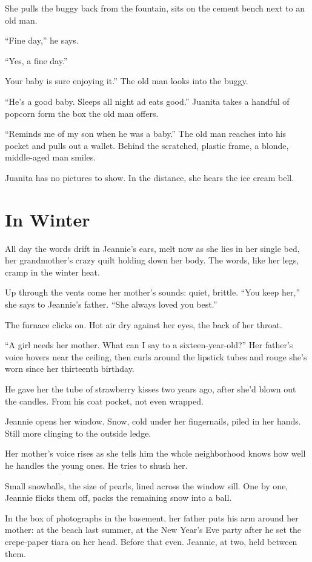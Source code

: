 \documentclass[twoside,10pt]{book}
\begin{document}
She pulls the buggy back from the fountain, sits on the cement bench
next to an old man.

``Fine day,'' he says.

``Yes, a fine day.''

Your baby is sure enjoying it.'' The old man looks into the buggy.

``He's a good baby. Sleeps all night ad eats good.'' Juanita takes a
handful of popcorn form the box the old man offers.

``Reminds me of my son when he was a baby.'' The old man reaches into
his pocket and pulls out a wallet. Behind the scratched, plastic frame,
a blonde, middle-aged man smiles.

Juanita has no pictures to show. In the distance, she hears the ice
cream bell.


\cleardoublepage
\chapter{In Winter}

All day the words drift in Jeannie's ears, melt now as she lies in her
single bed, her grand­mother's crazy quilt holding down her body. The
words, like her legs, cramp in the winter heat.

Up through the vents come her mother's sounds: quiet, brittle. ``You
keep her,'' she says to Jeannie's father. ``She always loved you best.''

The furnace clicks on. Hot air dry against her eyes, the back of her
throat.

``A girl needs her mother. What can I say to a sixteen-year-old?'' Her
father's voice hovers near the ceiling, then curls around the lipstick
tubes and rouge she's worn since her thirteenth birthday.

He gave her the tube of strawberry kisses two years ago, after she'd
blown out the candles. From his coat pocket, not even wrapped.

Jeannie opens her window. Snow, cold under her fingernails, piled in her
hands. Still more clinging to the outside ledge.

Her mother's voice rises as she tells him the whole neighborhood knows
how well he handles the young ones. He tries to shush her.

Small snowballs, the size of pearls, lined across the window sill. One
by one, Jeannie flicks them off, packs the remaining snow into a ball.

In the box of photographs in the basement, her father puts his arm
around her mother: at the beach last summer, at the New Year's Eve party
after he set the crepe-paper tiara on her head. Before that even.
Jeannie, at two, held between them.
\end{document}
